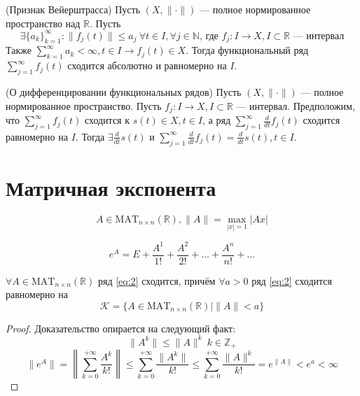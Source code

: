 \documentclass[11pt]{article}
\begin{document}
\begin{theorem}
    (Признак Вейерштрасса) Пусть $(X, \lVert \cdot \rVert)$ --- полное нормированное пространство над $\mathbb{R}$. Пусть 
    \[ \exists \{a_k\}_{k=1}^{\infty}: \lVert f_j(t) \rVert \leq a_j \ \forall t\in I, \forall j\in \mathbb{N} \text{, где } f_j: I\to X, I\subset \mathbb{R} \text{ --- интервал} \] 
    Также $\displaystyle \sum_{k=1}^{\infty} a_k < \infty, t\in I \to f_j(t)\in X$. Тогда функциональный ряд $\displaystyle \sum_{j=1}^{\infty} f_j(t)$ сходится абсолютно и равномерно на $I$. 
\end{theorem}

\begin{theorem}
    (О дифференцировании функциональных рядов) Пусть $(X, \lVert \cdot \rVert)$ --- полное нормированное пространство. Пусть $f_j: I\to X, I\subset \mathbb{R}$ --- интервал. Предположим, что $\displaystyle \sum_{j=1}^{\infty} f_j(t)$ сходится к $s(t)\in X, t\in I$, а ряд $\displaystyle \sum_{j=1}^{\infty} \frac{d}{dt} f_j(t)$ сходится 
    равномерно на $I$. Тогда $\displaystyle \exists \frac{d}{dt} s(t)$ и $\displaystyle \sum_{j=1}^{\infty} \frac{d}{dt} f_j(t) = \frac{d}{dt}s(t), t\in I$. 
\end{theorem}


\section{Матричная экспонента}

\begin{definition}
\[ A\in \mathrm{MAT}_{n\times n} (\mathbb{R}), \lVert A \rVert = \max_{|x|=1} |Ax|  \]
\end{definition}

\begin{equation}
    e ^A = E+ \frac{A^1}{1!} + \frac{A^2}{2!} + \ldots + \frac{A^n}{n!} + \ldots 
    \label{eq:2}
\end{equation}

\begin{statement}
    $ \forall A\in \mathrm{MAT}_{n\times n} (\mathbb{R})$ ряд \eqref{eq:2} сходится, причём $\forall a>0$ ряд \eqref{eq:2} сходится равномерно на 
    \[ \mathcal{K} = \{ A\in \mathrm{MAT}_{n\times n} (\mathbb{R}) | \lVert A \rVert < a \} \] 
\end{statement}

\begin{proof}
    Доказательство опирается на следующий факт:
    \[ \lVert A^k \rVert \leq \lVert A \rVert ^ k  \ k\in \mathbb{Z}_+  \]  
    \[ \lVert e^A \rVert = \left \lVert \sum_{k=0}^{+\infty} \frac{A^k}{k!} \right \rVert \leq \sum_{k=0}^{+\infty} \frac{\lVert A^k \rVert}{k!} \leq \sum_{k=0}^{+\infty} \frac{\lVert A \rVert ^k }{k!} = e^{\lVert A \rVert} < e^a < \infty \]    
\end{proof}
\end{document}
